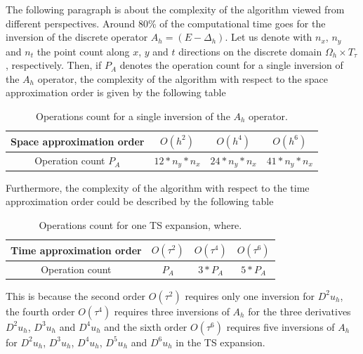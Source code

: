 \documentclass[11pt,a4paper,twoside]{article}
\begin{document}
The following paragraph is about the complexity of the algorithm viewed from different perspectives. Around 80\% of the computational time goes for the inversion of the discrete operator $A_h = (E - \Delta_h)$. Let us denote with $n_x$, $n_y$ and $n_t$ the point count along $x$, $y$ and $t$ directions on the discrete domain $\Omega_h \times T_{\tau}$, respectively. Then, if $P_A$ denotes the operation count for a single inversion of the $A_h$ operator, the complexity of the algorithm with respect to the space approximation order is given by the following table

\begin{center}
\begin{table}[!htbp]
\centering
		\begin{tabular}{||c|c|c|c||}
			\hline
			\hline
      Space approximation order  &        $O(h^2)$    &        $O(h^4)$     &        $O(h^6)$    \\
			\hline 
      Operation count $P_A$ &        $12 * n_y * n_x$    &        $24 * n_y * n_x$     &        $41 * n_y * n_x$    \\
			\hline
			\hline
		\end{tabular}
		\caption{Operations count for a single inversion of the $A_h$ operator.}

\label{tab:b}
\end{table}
\end{center}

Furthermore, the complexity of the algorithm with respect to the time approximation order could be described by the following table

\begin{center}
\begin{table}[!htbp]
\centering
		\begin{tabular}{||c|c|c|c||}
			\hline
			\hline
       Time approximation order  &        $O(\tau^2)$    &        $O(\tau^4)$     &        $O(\tau^6)$    \\
			\hline 
      Operation count  &        $P_A$    &        $3 * P_A$     &        $5 * P_A$    \\
			\hline
			\hline
		\end{tabular}
		\caption{Operations count for one TS expansion, where.}

\label{tab:c}
\end{table}
\end{center}

This is because the second order $O(\tau^2)$ requires only one inversion for $D^2 u_h$, the fourth order $O(\tau^4)$ requires three inversions of $A_h$ for the three derivatives $D^2 u_h$, $D^3 u_h$ and $D^4 u_h$ and the sixth order $O(\tau^6)$ requires five inversions of $A_h$ for $D^2 u_h$, $D^3 u_h$, $D^4 u_h$, $D^5 u_h$ and $D^6 u_h$ in the TS expansion.
\end{document}
